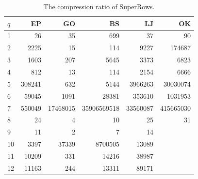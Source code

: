 \begin{table}
  \caption{The compression ratio of SuperRows.}\label{tab:compression_ratio}
  \begin{tabular}{lrrrrr}
    \toprule
    $q$ &     EP &       GO &          BS &       LJ &        OK \\
    \midrule
    1  &     26 &       35 &         699 &       37 &        90 \\
    2  &   2225 &       15 &         114 &     9227 &    174687 \\
    3  &   1603 &      207 &        5645 &     3373 &      6823 \\
    4  &    812 &       13 &         114 &     2154 &      6666 \\
    5  & 308241 &      632 &        5144 &  3966263 &  30030074 \\
    6  &  59045 &     1091 &       28381 &   353610 &   1031953 \\
    7  & 550049 & 17468015 & 35906569518 & 33560087 & 415665030 \\
    8  &     24 &        4 &          10 &       25 &        31 \\
    9  &     11 &        2 &           7 &       14 &        \\
    10 &   3397 &    37339 &     8700505 &    13089 &        \\
    11 &  10209 &      331 &       14216 &    38987 &        \\
    12 &  11163 &      244 &       13311 &    89171 &        \\
    \bottomrule
  \end{tabular}
\end{table}


